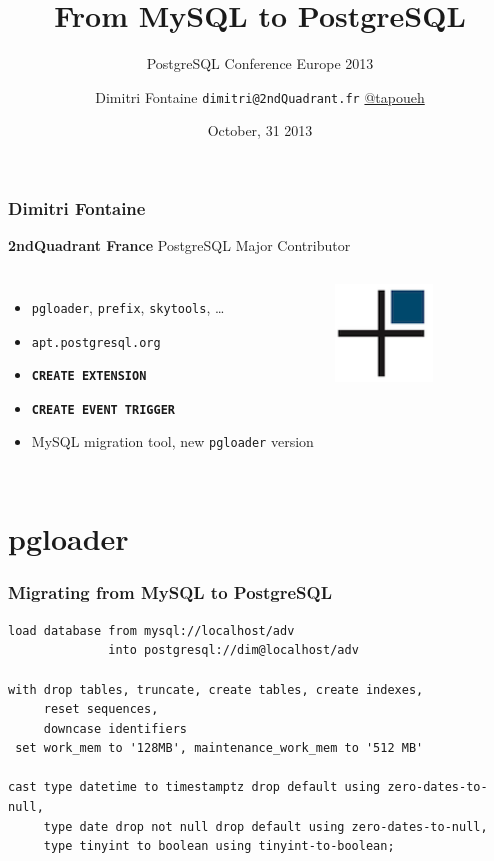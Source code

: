 \documentclass{beamer}
\title{From MySQL to PostgreSQL}
\subtitle{PostgreSQL Conference Europe 2013}
\author{Dimitri Fontaine \texttt{dimitri@2ndQuadrant.fr}
  \linebreak
  \url{@tapoueh}}
\date{October, 31 2013}
\begin{document}
\frame{\titlepage}

\begin{frame}[fragile]
  \frametitle{Dimitri Fontaine}

  \begin{center}
    \textbf{2ndQuadrant France}
    \linebreak
    PostgreSQL Major Contributor
  \end{center}
  \vfill

\begin{columns}[c]

  \begin{itemize}
   \item \texttt{pgloader}, \texttt{prefix}, \texttt{skytools}, …
   \item \texttt{apt.postgresql.org}
   \item \texttt{\textbf{CREATE EXTENSION}}
   \item \texttt{\textbf{CREATE EVENT TRIGGER}}
   \item MySQL migration tool, new \texttt{pgloader} version
  \end{itemize}  

\begin{center}
  \includegraphics[height=7em]{2ndQuadrant-cross.png}
\end{center}
\end{columns}
\end{frame}

\section{pgloader}

\begin{frame}[fragile]
  \frametitle{Migrating from MySQL to PostgreSQL}
  
  \vfill

\begin{verbatim}
load database from mysql://localhost/adv
              into postgresql://dim@localhost/adv

with drop tables, truncate, create tables, create indexes,
     reset sequences,
     downcase identifiers
 set work_mem to '128MB', maintenance_work_mem to '512 MB'

cast type datetime to timestamptz drop default using zero-dates-to-null,
     type date drop not null drop default using zero-dates-to-null,
     type tinyint to boolean using tinyint-to-boolean;
\end{verbatim}
\end{frame}
\end{document}
